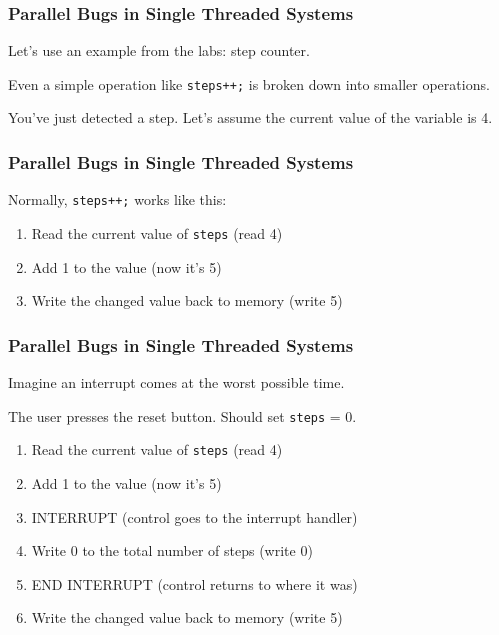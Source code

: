 \begin{frame}
\frametitle{Parallel Bugs in Single Threaded Systems}
\begin{changemargin}{1cm}
Let's use an example from the labs: step counter.

Even a simple operation like \texttt{steps++;} is broken down into smaller operations.

You've just detected a step. Let's assume the current value of the variable is 4.

\end{changemargin}
\end{frame}

\begin{frame}
\frametitle{Parallel Bugs in Single Threaded Systems}
\begin{changemargin}{1cm}
Normally, \texttt{steps++;} works like this:

\begin{enumerate}
	\item Read the current value of \texttt{steps} (read 4)
	\item Add 1 to the value (now it's 5)
	\item Write the changed value back to memory (write 5)
\end{enumerate}

\end{changemargin}
\end{frame}


\begin{frame}
\frametitle{Parallel Bugs in Single Threaded Systems}
\begin{changemargin}{1cm}
Imagine an interrupt comes at the worst possible time.

The user presses the reset button. Should set \texttt{steps} = 0.

\begin{enumerate}
	\item Read the current value of \texttt{steps} (read 4)
	\item Add 1 to the value (now it's 5)
	\item INTERRUPT (control goes to the interrupt handler)
	\item Write 0 to the total number of steps (write 0)
	\item END INTERRUPT (control returns to where it was)
	\item Write the changed value back to memory (write 5)
\end{enumerate}

\end{changemargin}
\end{frame}

